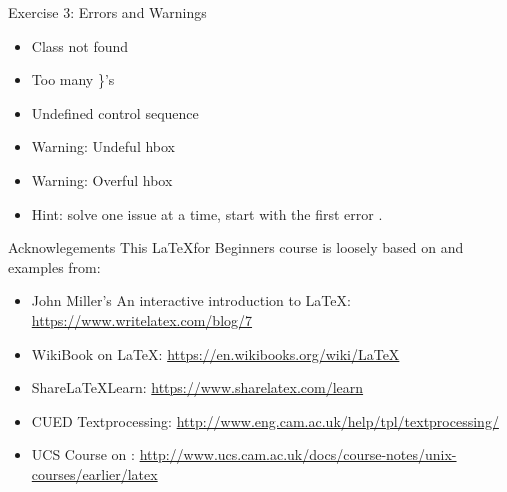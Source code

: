 \documentclass[10pt,times]{beamer}
\begin{document}
\begin{frame}{Exercise 3: Errors and Warnings}
\begin{itemize}
\item Class not found
\item Too many \}'s
\item Undefined control sequence
\item Warning: Undeful hbox
\item Warning: Overful hbox
\end{itemize}
\begin{center}
\end{center}

\begin{itemize}
\item Hint: solve one issue at a time, start with the first error
.
\end{itemize}

\end{frame}

\begin{frame}{Acknowlegements}
This \LaTeX for Beginners course is loosely based on and examples from:
\begin{itemize}
\item John Miller's An interactive introduction to \LaTeX: 
\href{https://www.writelatex.com/blog/7}{https://www.writelatex.com/blog/7}
\item WikiBook on \LaTeX: 
\href{https://en.wikibooks.org/wiki/LaTeX}{https://en.wikibooks.org/wiki/LaTeX}
\item Share\LaTeX Learn: 
\href{https://www.sharelatex.com/learn}{https://www.sharelatex.com/learn}
\item CUED Textprocessing: \href{http://www.eng.cam.ac.uk/help/tpl/textprocessing/}{http://www.eng.cam.ac.uk/help/tpl/textprocessing/}
\item UCS Course on \LaTeXe: \href{http://www.ucs.cam.ac.uk/docs/course-notes/unix-courses/earlier/latex}{http://www.ucs.cam.ac.uk/docs/course-notes/unix-courses/earlier/latex}
\end{itemize}
\end{frame}
\end{document}

